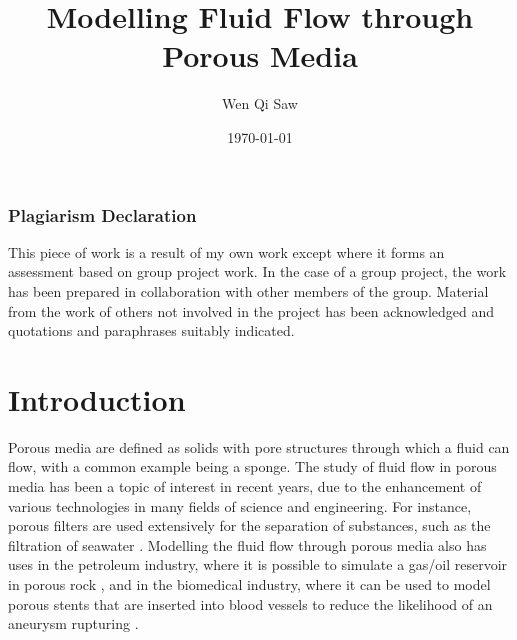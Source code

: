 \documentclass[a4paper, 11pt]{report}
\title{Modelling Fluid Flow through Porous Media}
\author{Wen Qi Saw}
\date{\today}
\begin{document}
\maketitle


\chapter*{}
\subsection*{Plagiarism Declaration}
This piece of work is a result of my own work except where it forms an assessment based on group project work. In the case of a group project, the work has been prepared in collaboration with other members of the group. Material from the work of others not involved in the project has been acknowledged and quotations and paraphrases suitably indicated.
\newpage

\tableofcontents
\newpage
\listoffigures

\hypersetup{linkcolor=cyan}

\chapter{Introduction} \label{chap:1}

Porous media are defined as solids with pore structures through which a fluid can flow, with a common example being a sponge. The study of fluid flow in porous media has been a topic of interest in recent years, due to the enhancement of various technologies in many fields of science and engineering. For instance, porous filters are used extensively for the separation of substances, such as the filtration of seawater \cite{HARITI2020}. Modelling the fluid flow through porous media also has uses in the petroleum industry, where it is possible to simulate a gas/oil reservoir in porous rock \cite{BALHOFF202293}, and in the biomedical industry, where it can be used to model porous stents that are inserted into blood vessels to reduce the likelihood of an aneurysm rupturing \cite{aneurysmstent, effectstentporosity}.
\end{document}
